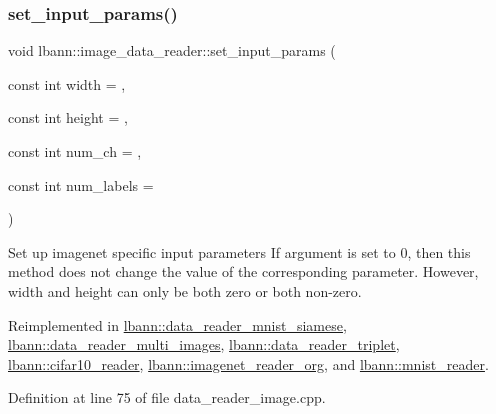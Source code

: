 \subsubsection{\texorpdfstring{set\+\_\+input\+\_\+params()}{set\_input\_params()}}
{\footnotesize\ttfamily void lbann\+::image\+\_\+data\+\_\+reader\+::set\+\_\+input\+\_\+params (\begin{DoxyParamCaption}\item[{const int}]{width = {},  }\item[{const int}]{height = {},  }\item[{const int}]{num\+\_\+ch = {},  }\item[{const int}]{num\+\_\+labels = {} }\end{DoxyParamCaption})\hspace{0.3cm}{\ttfamily [virtual]}}

Set up imagenet specific input parameters If argument is set to 0, then this method does not change the value of the corresponding parameter. However, width and height can only be both zero or both non-\/zero. 

Reimplemented in \hyperlink{classlbann_1_1data__reader__mnist__siamese_abe572754f0b1415407c1b698b0f83656}{lbann\+::data\+\_\+reader\+\_\+mnist\+\_\+siamese}, \hyperlink{classlbann_1_1data__reader__multi__images_afdb403556ed04a9142932e89ac60435e}{lbann\+::data\+\_\+reader\+\_\+multi\+\_\+images}, \hyperlink{classlbann_1_1data__reader__triplet_a8172b4ac97d18b51814578a19a7f75c7}{lbann\+::data\+\_\+reader\+\_\+triplet}, \hyperlink{classlbann_1_1cifar10__reader_a3915005f1278a840869b8519c30c808b}{lbann\+::cifar10\+\_\+reader}, \hyperlink{classlbann_1_1imagenet__reader__org_afb843084789c6a12e01a5d4a687003cf}{lbann\+::imagenet\+\_\+reader\+\_\+org}, and \hyperlink{classlbann_1_1mnist__reader_aa50ae6f2aeb5800de0e15e3ab9046338}{lbann\+::mnist\+\_\+reader}.



Definition at line 75 of file data\+\_\+reader\+\_\+image.\+cpp.


